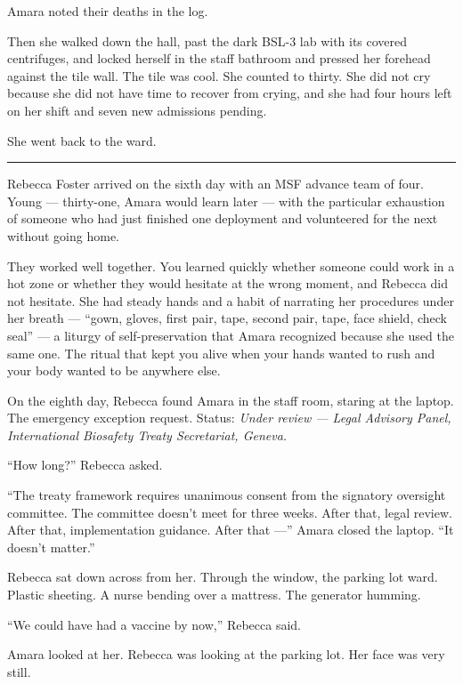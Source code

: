 Amara noted their deaths in the log.

Then she walked down the hall, past the dark BSL-3 lab with its covered centrifuges, and locked herself in the staff bathroom and pressed her forehead against the tile wall. The tile was cool. She counted to thirty. She did not cry because she did not have time to recover from crying, and she had four hours left on her shift and seven new admissions pending.

She went back to the ward.

\begin{center}\rule{0.3\linewidth}{0.4pt}\end{center}

Rebecca Foster arrived on the sixth day with an MSF advance team of four. Young --- thirty-one, Amara would learn later --- with the particular exhaustion of someone who had just finished one deployment and volunteered for the next without going home.

They worked well together. You learned quickly whether someone could work in a hot zone or whether they would hesitate at the wrong moment, and Rebecca did not hesitate. She had steady hands and a habit of narrating her procedures under her breath --- ``gown, gloves, first pair, tape, second pair, tape, face shield, check seal'' --- a liturgy of self-preservation that Amara recognized because she used the same one. The ritual that kept you alive when your hands wanted to rush and your body wanted to be anywhere else.

On the eighth day, Rebecca found Amara in the staff room, staring at the laptop. The emergency exception request. Status: \emph{Under review --- Legal Advisory Panel, International Biosafety Treaty Secretariat, Geneva.}

``How long?'' Rebecca asked.

``The treaty framework requires unanimous consent from the signatory oversight committee. The committee doesn't meet for three weeks. After that, legal review. After that, implementation guidance. After that ---'' Amara closed the laptop. ``It doesn't matter.''

Rebecca sat down across from her. Through the window, the parking lot ward. Plastic sheeting. A nurse bending over a mattress. The generator humming.

``We could have had a vaccine by now,'' Rebecca said.

Amara looked at her. Rebecca was looking at the parking lot. Her face was very still.

